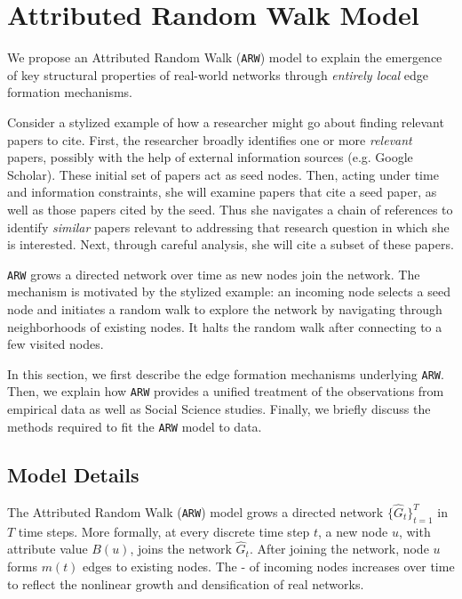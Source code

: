 
\section{Attributed Random Walk Model}
\label{sec:Proposed Model}
We propose an Attributed Random Walk (\texttt{ARW}) model to explain the emergence
of key structural properties of real-world networks through \textit{entirely local}
edge formation mechanisms.

Consider a stylized example of how a researcher might go about finding relevant papers to cite. First, the researcher broadly identifies one or more \textit{relevant} papers,
possibly with the help of external information sources (e.g. Google Scholar). These initial set of papers act as seed nodes.  Then, acting under time and information constraints, she will examine papers that cite a seed paper, as well as those papers cited by the seed. Thus she navigates a chain of references to identify \textit{similar} papers relevant to addressing that research question in which she is interested. Next, through careful analysis, she will cite a subset of these papers.

\texttt{ARW} grows a directed network over time as new nodes join the network. The
mechanism is motivated by the stylized example: an incoming node selects a seed node and initiates a random walk to explore the network by navigating through neighborhoods of existing nodes. It halts the random walk after connecting to a few visited nodes.

In this section, we first describe the edge formation mechanisms underlying \texttt{ARW}. Then, we explain how \texttt{ARW} provides a unified treatment of the observations from empirical data as well as Social Science studies. Finally, we briefly discuss the methods required to fit the \texttt{ARW} model to data.



\subsection{Model Details}
\label{sub:Model Description}


The Attributed Random Walk (\texttt{ARW}) model grows a directed network $\{\hat{G}_t\}^T_{t=1}$
in $T$ time steps.
More formally, at every discrete time step $t$, a
new node $u$, with attribute value $B(u)$, joins the network $\hat{G}_t$.
After joining the network, node $u$ forms $m(t)$ edges to
existing nodes.
The - of incoming nodes increases over time to
reflect the nonlinear growth and densification of real networks.

